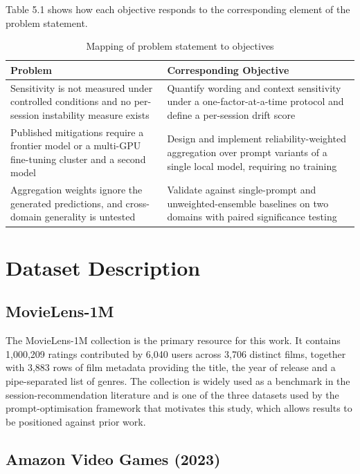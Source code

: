 \documentclass[12pt,a4paper,oneside]{report}
\begin{document}
Table 5.1 shows how each objective responds to the corresponding element of the
problem statement.

\begin{table}[h]
\centering
\small
\caption{Mapping of problem statement to objectives}
\begin{tabularx}{\textwidth}{@{}XX@{}}
\toprule
\textbf{Problem} & \textbf{Corresponding Objective}\\
\midrule
Sensitivity is not measured under controlled conditions and no per-session
instability measure exists &
Quantify wording and context sensitivity under a one-factor-at-a-time protocol
and define a per-session drift score\\[6pt]

Published mitigations require a frontier model or a multi-GPU fine-tuning
cluster and a second model &
Design and implement reliability-weighted aggregation over prompt variants of a
single local model, requiring no training\\[6pt]

Aggregation weights ignore the generated predictions, and cross-domain
generality is untested &
Validate against single-prompt and unweighted-ensemble baselines on two domains
with paired significance testing\\
\bottomrule
\end{tabularx}
\end{table}

\chapter{Dataset Description}

\section{MovieLens-1M}

The MovieLens-1M collection is the primary resource for this work. It contains
1{,}000{,}209 ratings contributed by 6{,}040 users across 3{,}706 distinct
films, together with 3{,}883 rows of film metadata providing the title, the year
of release and a pipe-separated list of genres. The collection is widely used as
a benchmark in the session-recommendation literature and is one of the three
datasets used by the prompt-optimisation framework that motivates this study,
which allows results to be positioned against prior work.

\section{Amazon Video Games (2023)}
\end{document}
